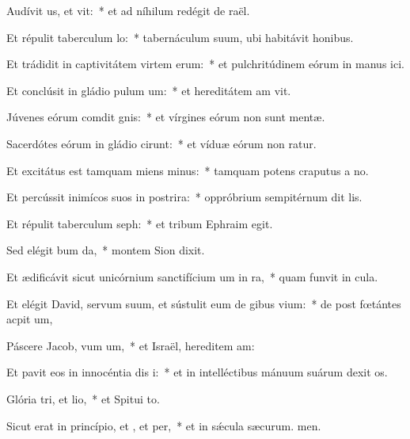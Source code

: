 \item Audívit us, et vit:~* et ad níhilum redégit de raël.
\item Et répulit taberculum lo:~* tabernáculum suum, ubi habitávit  honibus.
\item Et trádidit in captivitátem virtem erum:~* et pulchritúdinem eórum in manus ici.
\item Et conclúsit in gládio pulum um:~* et hereditátem am vit.
\item Júvenes eórum comdit gnis:~* et vírgines eórum non sunt mentæ.
\item Sacerdótes eórum in gládio cirunt:~* et víduæ eórum non ratur.
\item Et excitátus est tamquam miens minus:~* tamquam potens craputus a no.
\item Et percússit inimícos suos in postrira:~* oppróbrium sempitérnum dit lis.
\item Et répulit taberculum seph:~* et tribum Ephraim  egit.
\item Sed elégit bum da,~* montem Sion  dixit.
\item Et ædificávit sicut unicórnium sanctifícium um in ra,~* quam funvit in cula.
\item Et elégit David, servum suum, et sústulit eum de gibus vium:~* de post fœtántes acpit um,
\item Páscere Jacob, vum um,~* et Israël, hereditem am:
\item Et pavit eos in innocéntia dis i:~* et in intelléctibus mánuum suárum dexit os.
\item Glória tri, et lio,~* et Spitui to.
\item Sicut erat in princípio, et , et per,~* et in sǽcula sæcurum. men.
